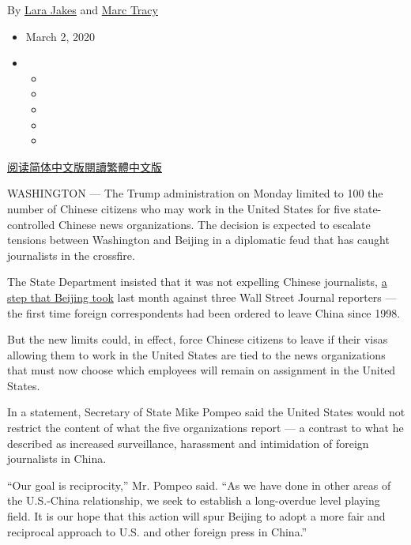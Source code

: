 By \href{https://www.nytimes3xbfgragh.onion/by/lara-jakes}{Lara Jakes}
and \href{https://www.nytimes3xbfgragh.onion/by/marc-tracy}{Marc Tracy}

\begin{itemize}
\item
  March 2, 2020
\item
  \begin{itemize}
  \item
  \item
  \item
  \item
  \item
  \end{itemize}
\end{itemize}

\href{https://cn.nytimes3xbfgragh.onion/usa/20200303/china-journalists-diplomats-expulsion/}{阅读简体中文版}\href{https://cn.nytimes3xbfgragh.onion/usa/20200303/china-journalists-diplomats-expulsion/zh-hant/}{閱讀繁體中文版}

WASHINGTON --- The Trump administration on Monday limited to 100 the
number of Chinese citizens who may work in the United States for five
state-controlled Chinese news organizations. The decision is expected to
escalate tensions between Washington and Beijing in a diplomatic feud
that has caught journalists in the crossfire.

The State Department insisted that it was not expelling Chinese
journalists,
\href{https://www.nytimes3xbfgragh.onion/2020/02/19/business/media/china-wall-street-journal.html}{a
step that Beijing took} last month against three Wall Street Journal
reporters --- the first time foreign correspondents had been ordered to
leave China since 1998.

But the new limits could, in effect, force Chinese citizens to leave if
their visas allowing them to work in the United States are tied to the
news organizations that must now choose which employees will remain on
assignment in the United States.

In a statement, Secretary of State Mike Pompeo said the United States
would not restrict the content of what the five organizations report ---
a contrast to what he described as increased surveillance, harassment
and intimidation of foreign journalists in China.

``Our goal is reciprocity,'' Mr. Pompeo said. ``As we have done in other
areas of the U.S.-China relationship, we seek to establish a
long-overdue level playing field. It is our hope that this action will
spur Beijing to adopt a more fair and reciprocal approach to U.S. and
other foreign press in China.''

